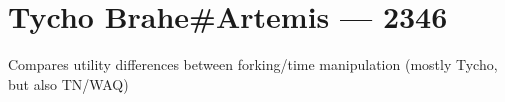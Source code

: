 \hypertarget{tycho-braheartemis-2346}{%
\chapter{Tycho Brahe\#Artemis — 2346}\label{tycho-braheartemis-2346}}

Compares utility differences between forking/time manipulation (mostly Tycho, but also TN/WAQ)
